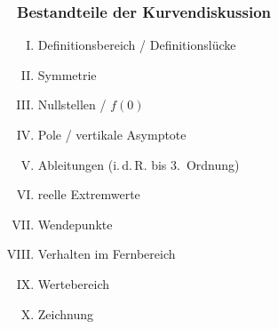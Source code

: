 \subsubsection{Bestandteile der Kurvendiskussion}

\begin{enumerate}[I.]
	\item Definitionsbereich / Definitionslücke
	\item Symmetrie
	\item Nullstellen / \( f(0) \)
	\item Pole / vertikale Asymptote
	\item Ableitungen (i.\,d.\,R. bis 3.~Ordnung)
	\item reelle Extremwerte
	\item Wendepunkte
	\item Verhalten im Fernbereich
	\item Wertebereich
	\item Zeichnung
\end{enumerate}
